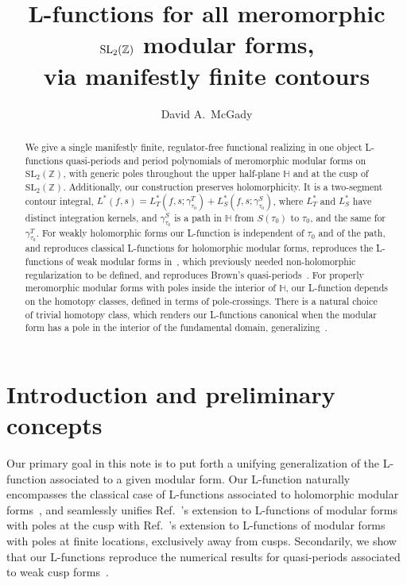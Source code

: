 \documentclass[11pt]{article}
\title{L-functions for all meromorphic $\SLZ$ modular forms,\\
via manifestly finite contours}
\author{David A.\ McGady}
\date{}
\newcommand{\HH}{\mathbb{H}}
\newcommand{\ZZ}{\mathbb{Z}}
\newcommand{\SLZ}{\mathrm{SL}_2(\ZZ)}
\begin{document}
\maketitle

\begin{abstract}
We give a single manifestly finite, regulator-free functional realizing in one object L-functions
quasi-periods and period polynomials of meromorphic modular forms on $\SLZ$, with generic 
poles throughout the upper half-plane $\HH$ and at the cusp of $\SLZ$. Additionally, our construction
preserves holomorphicity. It is a two-segment contour integral,
$L^*(f,s) = L^*_T(f, s; \gamma^T_{\tau_0}) + L^*_S(f, s; \gamma^S_{\tau_0})$, where $L^*_T$ and $L^*_S$ 
have distinct integration kernels, and 
$\gamma^{S}_{\tau_0}$ is a path in $\HH$ from $S(\tau_0)$ to $\tau_0$, and the same for $\gamma^T_{\tau_0}$. 
For weakly holomorphic forms our L-function is independent of $\tau_0$ and of the path, and reproduces 
classical L-functions for holomorphic modular forms, reproduces the L-functions of weak modular forms 
in~\cite{BFK2011}, which previously needed non-holomorphic regularization to be defined, and reproduces 
Brown's quasi-periods~\cite{Brown2017}. For properly meromorphic modular forms with poles inside the 
interior of $\HH$, our L-function depends on the homotopy classes, defined in terms of pole-crossings. 
There is a natural choice of trivial homotopy class, which renders our L-functions canonical when the 
modular form has a pole in the interior of the fundamental domain, generalizing~\cite{1806}.
\end{abstract}

\section{Introduction and preliminary concepts}\label{sec:intro}

Our primary goal in this note is to put forth a unifying generalization of the L-function 
associated to a given modular form. Our L-function naturally encompasses the classical 
case of L-functions associated to holomorphic modular forms~\cite{01-Apostol}, and 
seamlessly unifies Ref.~\cite{BFK2011}'s extension to L-functions of modular forms with 
poles at the cusp with Ref.~\cite{1806}'s extension to L-functions of modular forms with 
poles at finite locations, exclusively away from cusps. Secondarily, we show that our 
L-functions reproduce the numerical results for quasi-periods associated to weak cusp 
forms~\cite{Brown2017}. 
\end{document}
